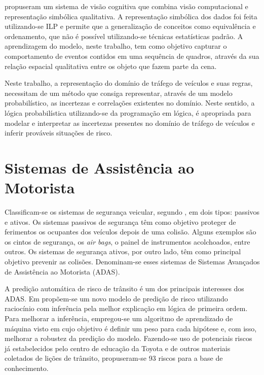\documentclass[
	12pt,				%
    oneside,			%
	a4paper,			%
	english,			%
	french,				%
	spanish,			%
	brazil,				%
	]{abntex2}
\begin{document}
 propuseram um sistema de visão cognitiva que combina visão computacional e representação simbólica qualitativa. A representação simbólica dos dados foi feita utilizando-se ILP e permite que a generalização de conceitos como equivalência e ordenamento, que não é possível utilizando-se técnicas estatísticas padrão.  A aprendizagem do modelo, neste trabalho, tem como objetivo capturar o comportamento de eventos contidos em uma sequência de quadros, através da sua relação espacial qualitativa entre os objeto que fazem parte da cena.

Neste trabalho, a representação do domínio de tráfego de veículos e suas regras, necessitam de um método que consiga representar, através de um modelo probabilístico, as incertezas e correlações existentes no domínio. Neste sentido, a lógica probabilística utilizando-se da programação em lógica, é apropriada para modelar e interpretar as incertezas presentes no domínio de tráfego de veículos e inferir prováveis situações de risco.

\section {Sistemas de Assistência ao Motorista}

Classificam-se os sistemas de segurança veicular, segundo  , em dois tipos: passivos e ativos. Os sistemas passivos de segurança têm como objetivo proteger de ferimentos os ocupantes dos veículos depois de uma colisão. Alguns exemplos são os cintos de segurança, os \textit{air bags}, o painel de instrumentos acolchoados, entre outros. Os sistemas de segurança ativos, por outro lado, têm como principal objetivo prevenir as colisões. Denominam-se esses sistemas de Sistemas Avançados de Assistência ao Motorista (ADAS).

A predição automática de risco de trânsito é um dos principais interesses dos ADAS. Em  propõem-se um novo modelo de predição de risco utilizando raciocínio com inferência pela melhor explicação em lógica de primeira ordem. Para melhorar a inferência, empregou-se um algoritmo de aprendizado de máquina visto em  cujo objetivo é definir um peso para cada hipótese e, com isso, melhorar a robustez da predição do modelo. Fazendo-se uso de potenciais riscos já estabelecidos pelo centro de educação da Toyota e de outros materiais coletados de lições de trânsito, propuseram-se 93 riscos para a base de conhecimento.
\end{document}

